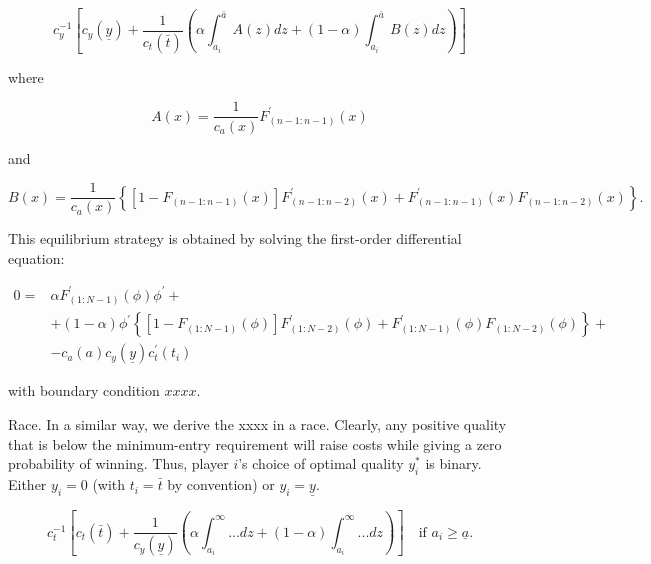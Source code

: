 \documentclass[12pt,]{article}
\theoremstyle{plain} %
\newcommand\deadline{\bar{t}}
\newcommand\target{\underline{y}}
\newcommand\ctime{c_{t}}
\newcommand\cscore{c_{y}}
\newcommand\mtype{\underline{a}}
\newcommand\hitype{\bar{a}}
\begin{document}
\begin{equation}  \label{eq: optimal time tournament}
  \cscore^{-1}
  \left[\cscore(\target) 
    + \frac{1}{\ctime(\deadline)}
    \left(
      \alpha \int_{a_i}^{\hitype} A(z) dz
      + (1-\alpha) \int_{a_i}^{\hitype} B(z)  dz
    \right)
  \right]
\end{equation}

where

\begin{equation}
  A(x) = \frac{1}{c_{a}(x)} F_{(n-1:n-1)}^{\prime}(x)
\end{equation}

and

\begin{equation}
  B(x) = \frac{1}{c_{a}(x)} \left\{
      \left[1- F_{(n-1:n-1)}(x)\right]F_{(n-1:n-2)}^{\prime}(x)
      + F_{(n-1:n-1)}^{\prime}(x) F_{(n-1:n-2)}(x)
    \right\}.
\end{equation}

This equilibrium strategy is obtained by solving the first-order
differential equation:

\begin{align} \label{foc0}
  0 = & \alpha F_{(1:N-1)}^{\prime}(\phi) \phi^{\prime} + \nonumber\\
    & + (1-\alpha)\phi^{\prime}\left\{
        \left[1 - F_{(1:N-1)}(\phi)\right]F_{(1:N-2)}^{\prime}(\phi)
        + F_{(1:N-1)}^{\prime}(\phi) F_{(1:N-2)}(\phi)\right\} + \nonumber\\
    & - c_{a}(a) c_{y}(\target) c_{t}^{\prime}(t_i)
\end{align}

with boundary condition \(xxxx\).

Race. In a similar way, we derive the xxxx in a race. Clearly, any
positive quality that is below the minimum-entry requirement will raise
costs while giving a zero probability of winning. Thus, player \(i\)'s
choice of optimal quality \(y_i^*\) is binary. Either \(y_i=0\) (with
\(t_i=\deadline\) by convention) or \(y_i= \target\).

\begin{equation} 
  \label{eq: optimal time race}
  \ctime^{-1}
  \left[
    \ctime(\deadline) 
    + \frac{1}{\cscore(\target)}\left(
      \alpha \int_{a_i}^{\infty} ... dz
      + (1-\alpha) \int_{a_i}^{\infty} ...  dz
    \right)
  \right]
  \quad \text{if }a_i \geq \mtype.
\end{equation}
\end{document}
